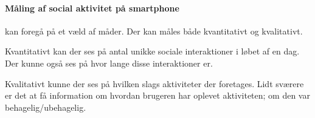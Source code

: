 \paragraph{Måling af social aktivitet på smartphone} kan foregå på et væld af måder.
Der kan måles både kvantitativt og kvalitativt.

Kvantitativt kan der ses på antal unikke sociale interaktioner i løbet af en dag.
Der kunne også ses på hvor lange disse interaktioner er.

Kvalitativt kunne der ses på hvilken slags aktiviteter der foretages.
Lidt sværere er det at få information om hvordan brugeren har oplevet aktiviteten; om den var behagelig/ubehagelig.
